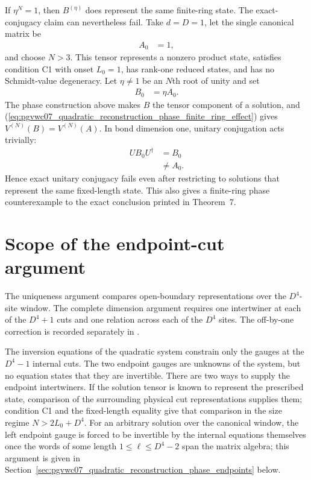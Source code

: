 \documentclass{article}
\begin{document}
If $\eta^N=1$, then $B^{(\eta)}$ does represent the same finite-ring state.
The exact-conjugacy claim can nevertheless fail. Take $d=D=1$, let the single
canonical matrix be
\begin{align}
    A_0
     & =1,
    \label{eq:pgvwc07_quadratic_reconstruction_phase_product_tensor}
\end{align}
and choose $N>3$. This tensor represents a nonzero product state, satisfies
condition C1 with onset $L_0=1$, has rank-one reduced states, and has no
Schmidt-value degeneracy. Let $\eta\neq1$ be an $N$th root of unity and set
\begin{align}
    B_0
     & =\eta A_0.
    \label{eq:pgvwc07_quadratic_reconstruction_phase_product_rephasing}
\end{align}
The phase construction above makes $B$ the tensor component of a solution, and
(\ref{eq:pgvwc07_quadratic_reconstruction_phase_finite_ring_effect}) gives
$V^{(N)}(B)=V^{(N)}(A)$. In bond dimension one, unitary conjugation acts
trivially:
\begin{align}
    UB_0U^\dagger
     & =B_0
    \label{eq:pgvwc07_quadratic_reconstruction_phase_scalar_conjugation} \\
     & \neq A_0.
    \label{eq:pgvwc07_quadratic_reconstruction_phase_scalar_conjugation_failure}
\end{align}
Hence exact unitary conjugacy fails even after restricting to solutions that
represent the same fixed-length state. This also gives a finite-ring phase
counterexample to the exact conclusion printed in Theorem~7.

\section{Scope of the endpoint-cut argument}

The uniqueness argument compares open-boundary representations over the
$D^4$-site window. The complete dimension argument requires one intertwiner at
each of the $D^4+1$ cuts and one relation across each of the $D^4$ sites. The
off-by-one correction is recorded separately in
.

The inversion equations of the quadratic system constrain only the gauges at
the $D^4-1$ internal cuts. The two endpoint gauges are unknowns of the system,
but no equation states that they are invertible. There are two ways to supply
the endpoint intertwiners. If the solution tensor is known to represent the
prescribed state, comparison of the surrounding physical cut representations
supplies them; condition C1 and the fixed-length equality give that comparison
in the size regime $N>2L_0+D^4$. For an arbitrary solution over the canonical
window, the left endpoint gauge is forced to be invertible by the internal
equations themselves once the words of some length $1\leq\ell\leq D^4-2$ span
the matrix algebra; this argument is given in
Section~\ref{sec:pgvwc07_quadratic_reconstruction_phase_endpoints} below.
\end{document}
